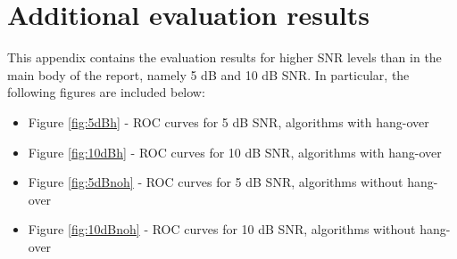 
\chapter{Additional evaluation results} %

\label{AppendixA} %


This appendix contains the evaluation results for higher SNR levels than in the main body of the report, namely  5 dB and 10 dB SNR. In particular, the following figures are included below:

\begin{itemize}
\item Figure \ref{fig:5dBh} - ROC curves for 5 dB SNR, algorithms with hang-over
\item Figure \ref{fig:10dBh} - ROC curves for 10 dB SNR, algorithms with hang-over
\item Figure \ref{fig:5dBnoh} - ROC curves for 5 dB SNR, algorithms without hang-over
\item Figure \ref{fig:10dBnoh} - ROC curves for 10 dB SNR, algorithms without hang-over
\end{itemize}

